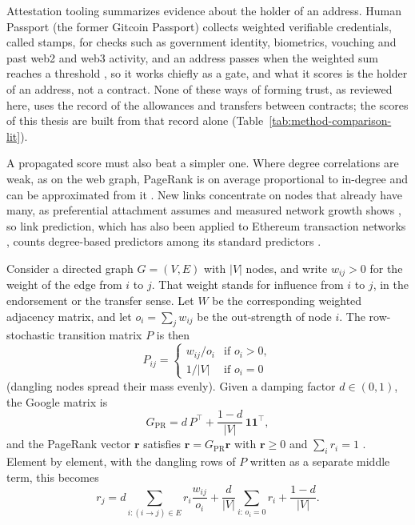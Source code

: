 Attestation tooling summarizes evidence about the holder of an address. Human Passport (the former Gitcoin Passport) collects weighted verifiable credentials, called stamps, for checks such as government identity, biometrics, vouching and past web2 and web3 activity, and an address passes when the weighted sum reaches a threshold \parencite{humanpassportnddocs}, so it works chiefly as a gate, and what it scores is the holder of an address, not a contract. None of these ways of forming trust, as reviewed here, uses the record of the allowances and transfers between contracts; the scores of this thesis are built from that record alone (Table~\ref{tab:method-comparison-lit}).

A propagated score must also beat a simpler one. Where degree correlations are weak, as on the web graph, PageRank is on average proportional to in-degree and can be approximated from it \parencite{fortunato2008indegree}. New links concentrate on nodes that already have many, as preferential attachment assumes \parencite{barabasi1999scaling} and measured network growth shows \parencite{newman2001clustering}, so link prediction, which has also been applied to Ethereum transaction networks \parencite{lin2022tracking}, counts degree-based predictors among its standard predictors \parencite{libennowell2007link}.


Consider a directed graph $G=(V,E)$ with $|V|$ nodes, and write $w_{ij}>0$ for the weight of the edge from $i$ to $j$. That weight stands for influence from $i$ to $j$, in the endorsement or the transfer sense. Let $W$ be the corresponding weighted adjacency matrix, and let $o_i=\sum_j w_{ij}$ be the out-strength of node $i$. The row-stochastic transition matrix $P$ is then
\begin{equation}
P_{ij} =
\begin{cases}
w_{ij}/o_i & \text{if } o_i>0,\\
1/|V| & \text{if } o_i=0
\end{cases}
\label{eq:transition}
\end{equation}
(dangling nodes spread their mass evenly). Given a damping factor $d\in(0,1)$, the Google matrix is
\begin{equation}
G_{\mathrm{PR}} = d\, P^{\top} + \frac{1-d}{|V|}\,\mathbf{1}\mathbf{1}^{\top},
\label{eq:google-matrix}
\end{equation}
and the PageRank vector $\mathbf{r}$ satisfies $\mathbf{r}=G_{\mathrm{PR}}\mathbf{r}$ with $\mathbf{r}\geq 0$ and $\sum_i r_i=1$ \parencite{langville2006pagerank}. Element by element, with the dangling rows of $P$ written as a separate middle term, this becomes
\begin{equation}
r_j = d\sum_{i:(i\to j)\in E} r_i \frac{w_{ij}}{o_i} + \frac{d}{|V|}\sum_{i:\,o_i=0} r_i + \frac{1-d}{|V|}.
\label{eq:pagerank-node}
\end{equation}

